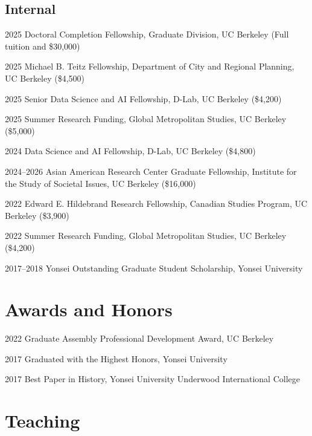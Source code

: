 \documentclass[11pt,letterpaper]{article}
\newcommand{\money}[1]{(\$#1)}
\newcommand{\term}[1]{(#1)}
\begin{document}
\subsection{Internal}
\begin{tablist}
  \item[2025] \tab{}Doctoral Completion Fellowship, Graduate Division, UC Berkeley \term{Full tuition and \$30,000}
  \item[2025] \tab{}Michael B. Teitz Fellowship, Department of City and Regional Planning, UC Berkeley \money{4,500}
  \item[2025] \tab{}Senior Data Science and AI Fellowship, D-Lab, UC Berkeley \money{4,200}
  \item[2025] \tab{}Summer Research Funding, Global Metropolitan Studies, UC Berkeley \money{5,000}
  \item[2024] \tab{}Data Science and AI Fellowship, D-Lab, UC Berkeley \money{4,800}
  \item[2024–2026] \tab{}Asian American Research Center Graduate Fellowship, Institute for the Study of Societal Issues, UC Berkeley \money{16,000}
  \item[2022] \tab{}Edward E. Hildebrand Research Fellowship, Canadian Studies Program, UC Berkeley \money{3,900}
  \item[2022] \tab{}Summer Research Funding, Global Metropolitan Studies, UC Berkeley \money{4,200}
  \item[2017–2018] \tab{}Yonsei Outstanding Graduate Student Scholarship, Yonsei University
\end{tablist}

\section{Awards and Honors}
\begin{tablist}
  \item[2022] \tab{}Graduate Assembly Professional Development Award, UC Berkeley
  \item[2017] \tab{}Graduated with the Highest Honors, Yonsei University
  \item[2017] \tab{}Best Paper in History, Yonsei University Underwood International College
\end{tablist}

\section{Teaching}
\end{document}
